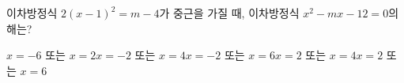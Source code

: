 이차방정식 $2(x-1)^2=m-4$가 중근을 가질 때, 이차방정식 $x^2-mx-12=0$의 해는? 
\begin{choicesii}{$x=-6$ 또는 $x=2$}{$x=-2$ 또는 $x=4$}{$x=-2$ 또는 $x=6$}{$x=2$ 또는 $x=4$}{$x=2$ 또는 $x=6$}\end{choicesii}
